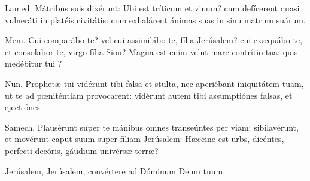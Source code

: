 
Lamed. 
Mátribus suis dixérunt: Ubi est tríticum et vinum? cum defícerent quasi vulneráti in platéis civitátis: cum exhalárent ánimas suas in sinu matrum suárum.

Mem. 
Cui comparábo te? vel cui assimilábo te, fília Jerúsalem? cui exæquábo te, et consolabor te, virgo fília Sion? Magna est enim velut mare contrítio tua: quis medébitur tui ?

Nun. 
Prophetæ tui vidérunt tibi falsa et stulta, nec aperiébant iniquitátem tuam, ut te ad pœniténtiam provocarent: vidérunt autem tibi assumptiónes falsas, et ejectiónes.

Samech. 
Plausérunt super te mánibus omnes transeúntes per viam: sibilavérunt, et movérunt caput suum super filiam Jerúsalem: Hæccine est urbs, dicéntes, perfecti decóris, gáudium univérsæ terræ?

Jerúsalem, Jerúsalem, convértere ad Dóminum Deum tuum.
\par